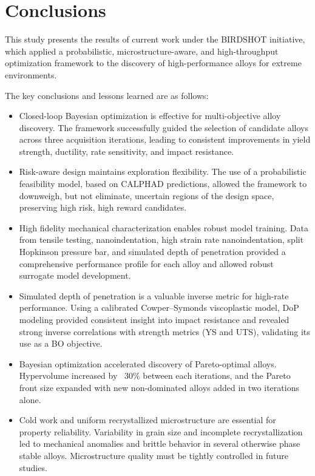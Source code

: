 \section{Conclusions}\label{sec:Conclusion} 


This study presents the results of current work under the BIRDSHOT initiative, which applied a probabilistic, microstructure-aware, and high-throughput optimization framework to the discovery of high-performance alloys for extreme environments. 


The key conclusions and lessons learned are as follows:

\begin{itemize}
    \item Closed-loop Bayesian optimization is effective for multi-objective alloy discovery. The framework successfully guided the selection of candidate alloys across three acquisition iterations, leading to consistent improvements in yield strength, ductility, rate sensitivity, and impact resistance.

    \item Risk-aware design maintains exploration flexibility. The use of a probabilistic feasibility model, based on CALPHAD predictions, allowed the framework to downweigh, but not eliminate, uncertain regions of the design space, preserving high risk, high reward candidates.

    \item High fidelity mechanical characterization enables robust model training. Data from tensile testing, nanoindentation, high strain rate nanoindentation, split Hopkinson pressure bar, and simulated depth of penetration provided a comprehensive performance profile for each alloy and allowed robust surrogate model development.

    \item Simulated depth of penetration is a valuable inverse metric for high-rate performance. Using a calibrated Cowper–Symonds viscoplastic model, DoP modeling provided consistent insight into impact resistance and revealed strong inverse correlations with strength metrics (YS and UTS), validating its use as a BO objective.

    \item Bayesian optimization accelerated discovery of Pareto-optimal alloys. Hypervolume increased by ~30\% between each iterations, and the Pareto front size expanded with new non-dominated alloys added in two iterations alone.

    \item Cold work and uniform recrystallized microstructure are essential for property reliability. Variability in grain size and incomplete recrystallization led to mechanical anomalies and brittle behavior in several otherwise phase stable alloys. Microstructure quality must be tightly controlled in future studies.


\end{itemize}
